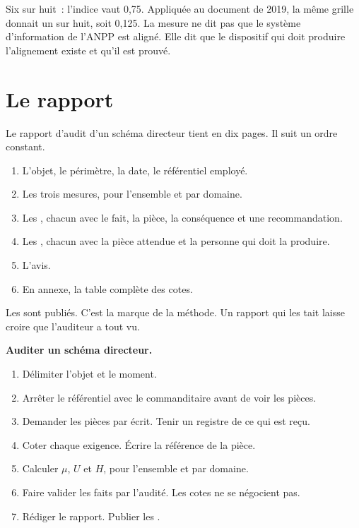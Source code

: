 Six \OUI{} sur huit~: l'indice vaut 0,75. Appliquée au document de 2019, la même grille donnait un \OUI{} sur
huit, soit 0,125. La mesure ne dit pas que le système d'information de l'ANPP est aligné. Elle dit que le
dispositif qui doit produire l'alignement existe et qu'il est prouvé.

\section{Le rapport}
\label{sec:c16-rapport}

Le rapport d'audit d'un schéma directeur tient en dix pages. Il suit un ordre constant.

\begin{enumerate}
    \item L'objet, le périmètre, la date, le référentiel employé.
    \item Les trois mesures, pour l'ensemble et par domaine.
    \item Les \NON{}, chacun avec le fait, la pièce, la conséquence et une recommandation.
    \item Les \NEK{}, chacun avec la pièce attendue et la personne qui doit la produire.
    \item L'avis.
    \item En annexe, la table complète des cotes.
\end{enumerate}

Les \NEK{} sont publiés. C'est la marque de la méthode. Un rapport qui les tait laisse croire que l'auditeur a
tout vu.

\begin{boxprocedure}
\textbf{Auditer un schéma directeur.}
\begin{enumerate}
    \item Délimiter l'objet et le moment.
    \item Arrêter le référentiel avec le commanditaire avant de voir les pièces.
    \item Demander les pièces par écrit. Tenir un registre de ce qui est reçu.
    \item Coter chaque exigence. Écrire la référence de la pièce.
    \item Calculer $\mu$, $U$ et $H$, pour l'ensemble et par domaine.
    \item Faire valider les faits par l'audité. Les cotes ne se négocient pas.
    \item Rédiger le rapport. Publier les \NEK{}.
\end{enumerate}
\end{boxprocedure}

